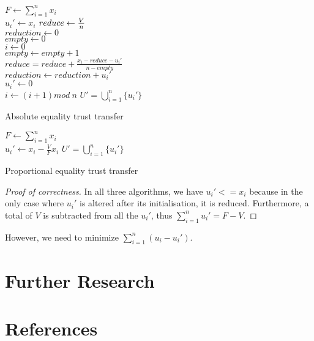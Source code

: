 \documentclass[11pt]{article}
\theoremstyle{definition}
\theoremstyle{corollary}
\begin{document}
    \begin{algorithm}[H]
       $F \gets \sum_{i=1}^{n}x_i$ \\
          {$u_i' \gets x_i$}
       $reduce \gets {V \over n}$ \\
       $reduction \gets 0$ \\
       $empty \gets 0$ \\
       $i \gets 0$ \\
          {
                {$empty \gets empty + 1$ \\
                 $reduce = reduce + \frac{x_i - reduce -u_i'}{n - empty}$ \\
                 $reduction \gets reduction + u_i'$ \\
                 $u_i' \gets 0$ \\}
           $i \gets (i + 1) mod \:n$}
       \Return $U' = \bigcup_{i=1}^{n}\{u_i'\}$
       \caption{Absolute equality trust transfer}
    \end{algorithm}

    \begin{algorithm}[H]
       $F \gets \sum_{i=1}^{n}x_i$ \\
          {$u_i' \gets x_i - \frac{V}{F} x_i$}
       \Return $U' = \bigcup_{i=1}^{n}\{u_i'\}$
       \caption{Proportional equality trust transfer}
    \end{algorithm}
    \begin{proof}[Proof of correctness]
       In all three algorithms, we have $u_i' <= x_i$ because in the only case where $u_i'$ is altered after its
       initialisation, it is reduced. Furthermore, a total of $V$ is subtracted from all the $u_i'$, thus
       $\sum_{i=1}^{n}u_i' = F - V$.
    \end{proof}

    However, we need to minimize $\sum_{i=1}^{n}(u_i-u_i')$.

  \section{Further Research}

  \section{References}
\end{document}
